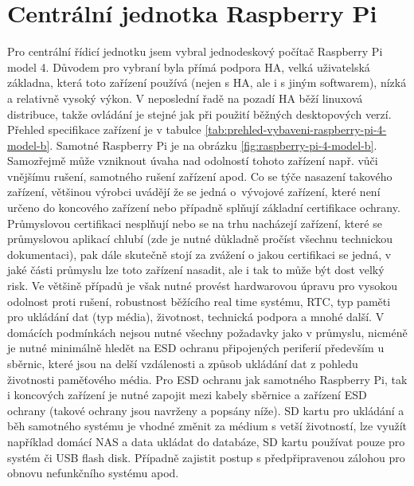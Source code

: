\section{Centrální jednotka Raspberry Pi}
Pro centrální řídicí jednotku jsem vybral jednodeskový počítač Raspberry Pi model 4. Důvodem pro vybraní byla přímá podpora HA, velká uživatelská základna, která toto zařízení používá (nejen s HA, ale i s jiným softwarem), nízká a relativně vysoký výkon. V neposlední řadě na pozadí HA běží linuxová distribuce, takže ovládání je stejné jak při použití běžných desktopových verzí. Přehled specifikace zařízení je v tabulce \ref{tab:prehled-vybaveni-raspberry-pi-4-model-b}. Samotné Raspberry Pi je na obrázku \ref{fig:raspberry-pi-4-model-b}. Samozřejmě může vzniknout úvaha nad odolností tohoto zařízení např. vůči vnějšímu rušení, samotného rušení zařízení apod. Co se týče nasazení takového zařízení, většinou výrobci uvádějí že se jedná o~vývojové zařízení, které není určeno do koncového zařízení nebo případně splňují  základní certifikace ochrany. Průmyslovou certifikaci nesplňují nebo se na trhu nacházejí zařízení, které se průmyslovou aplikací chlubí (zde je nutné důkladně pročíst všechnu technickou dokumentaci), pak dále skutečně stojí za zvážení o jakou certifikaci se jedná, v jaké části průmyslu lze toto zařízení nasadit, ale i tak to může být dost velký risk. Ve většině případů je však nutné provést hardwarovou úpravu pro vysokou odolnost proti rušení, robustnost běžícího real time systému, RTC, typ paměti pro ukládání dat (typ média), životnost, technická podpora a mnohé další. V domácích podmínkách nejsou nutné všechny požadavky jako v průmyslu, nicméně je nutné minimálně hledět na ESD ochranu připojených periferií především u sběrnic, které jsou na delší vzdálenosti a způsob ukládání dat z pohledu životnosti paměťového média. Pro ESD ochranu jak samotného Raspberry Pi, tak i koncových zařízení je nutné zapojit mezi kabely sběrnice a zařízení ESD ochrany (takové ochrany jsou navrženy a popsány níže). SD kartu pro ukládání a běh samotného systému je vhodné změnit za médium s vetší životností, lze využít například domácí NAS a data ukládat do databáze, SD kartu používat pouze pro systém či USB flash disk. Případně zajistit postup s předpřipravenou zálohou pro obnovu nefunkčního systému apod. 

